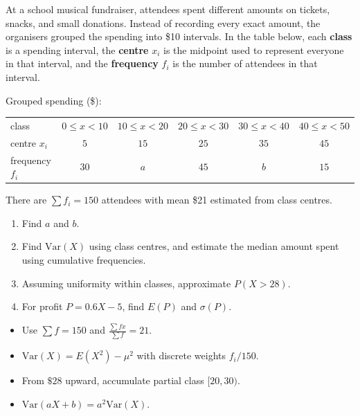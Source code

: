 \begin{problem}
At a school musical fundraiser, attendees spent different amounts on tickets, snacks, and small donations. Instead of recording every exact amount, the organisers grouped the spending into \$10 intervals. In the table below, each \textbf{class} is a spending interval, the \textbf{centre} $x_i$ is the midpoint used to represent everyone in that interval, and the \textbf{frequency} $f_i$ is the number of attendees in that interval.

Grouped spending (\$):

\begin{center}
\small
\begin{tabular}{|l|c|c|c|c|c|}
\hline
class & $0\le x<10$ & $10\le x<20$ & $20\le x<30$ & $30\le x<40$ & $40\le x<50$ \\
centre $x_{i}$ & $5$ & $15$ & $25$ & $35$ & $45$ \\
frequency $f_{i}$ & $30$ & $a$ & $45$ & $b$ & $15$ \\
\hline
\end{tabular}
\end{center}

There are $\sum f_{i}=150$ attendees with mean \$21 estimated from class centres.
\begin{enumerate}[label=\textbf{(\roman*)}]
  \item Find $a$ and $b$.
  \item Find $\mathrm{Var}(X)$ using class centres, and estimate the median amount spent using cumulative frequencies.
  \item Assuming uniformity within classes, approximate $P(X>28)$.
  \item For profit $P=0{.}6X-5$, find $E(P)$ and $\sigma(P)$.
\end{enumerate}
\end{problem}

\begin{hint}
\begin{itemize}[leftmargin=*]
  \item Use $\sum f=150$ and $\frac{\sum f x}{\sum f}=21$.
  \item $\mathrm{Var}(X)=E(X^{2})-\mu^{2}$ with discrete weights $f_{i}/150$.
  \item From $\$28$ upward, accumulate partial class $[20{,}30)$.
  \item $\mathrm{Var}(aX+b)=a^{2}\mathrm{Var}(X)$.
\end{itemize}
\end{hint}

